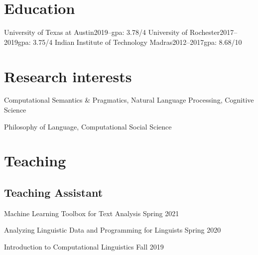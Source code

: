 \documentclass[10pt,a4paper]{mycv}
\begin{document}
\cfoot{\sansc \thepage}
\makecvtitle


\section{Education}
    {University of Texas at Austin}{2019--}{\rmsc gpa: 3.78/4}{}
    {University of Rochester}{2017--2019}{\rmsc gpa: 3.75/4}{}
    {Indian Institute of Technology Madras}{2012--2017}{\rmsc gpa: 8.68/10}{}

\section{Research interests}

Computational Semantics \& Pragmatics, Natural Language Processing, Cognitive Science

Philosophy of Language, Computational Social Science


\begingroup
\setlength\bibitemsep{2ex}
\printbibliography[title={\sansc Papers}, nottype=unpublished]
\endgroup

\begingroup
\setlength\bibitemsep{2ex}
\printbibliography[title={\sansc Talks}, type=unpublished]
\endgroup


\section{Teaching}

\subsection{Teaching Assistant}

Machine Learning Toolbox for Text Analysis \hfill Spring 2021

Analyzing Linguistic Data and Programming for Linguists \hfill Spring 2020

Introduction to Computational Linguistics \hfill Fall 2019
\end{document}

